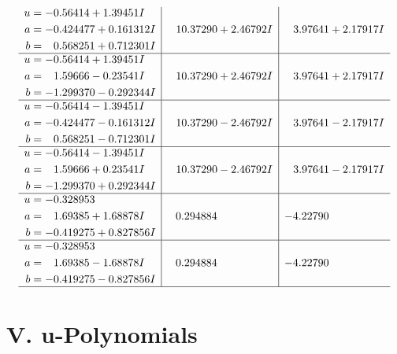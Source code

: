 \documentclass[1p]{elsarticle_modified}
\theoremstyle{definition}
\begin{document}
$$\begin{array}{c|c|c}
\begin{aligned}
u &= -0.56414 + 1.39451 I \\
a &= -0.424477 + 0.161312 I \\
b &= \phantom{-}0.568251 + 0.712301 I\end{aligned}
 & \phantom{-}10.37290 + 2.46792 I & \phantom{-}3.97641 + 2.17917 I \\ \hline\begin{aligned}
u &= -0.56414 + 1.39451 I \\
a &= \phantom{-}1.59666 - 0.23541 I \\
b &= -1.299370 - 0.292344 I\end{aligned}
 & \phantom{-}10.37290 + 2.46792 I & \phantom{-}3.97641 + 2.17917 I \\ \hline\begin{aligned}
u &= -0.56414 - 1.39451 I \\
a &= -0.424477 - 0.161312 I \\
b &= \phantom{-}0.568251 - 0.712301 I\end{aligned}
 & \phantom{-}10.37290 - 2.46792 I & \phantom{-}3.97641 - 2.17917 I \\ \hline\begin{aligned}
u &= -0.56414 - 1.39451 I \\
a &= \phantom{-}1.59666 + 0.23541 I \\
b &= -1.299370 + 0.292344 I\end{aligned}
 & \phantom{-}10.37290 - 2.46792 I & \phantom{-}3.97641 - 2.17917 I \\ \hline\begin{aligned}
u &= -0.328953\phantom{ +0.000000I} \\
a &= \phantom{-}1.69385 + 1.68878 I \\
b &= -0.419275 + 0.827856 I\end{aligned}
 & \phantom{-}0.294884\phantom{ +0.000000I} & -4.22790\phantom{ +0.000000I} \\ \hline\begin{aligned}
u &= -0.328953\phantom{ +0.000000I} \\
a &= \phantom{-}1.69385 - 1.68878 I \\
b &= -0.419275 - 0.827856 I\end{aligned}
 & \phantom{-}0.294884\phantom{ +0.000000I} & -4.22790\phantom{ +0.000000I}\\
 \hline 
 \end{array}$$\newpage
\newpage\renewcommand{\arraystretch}{1}
\centering \section*{ V. u-Polynomials}
\end{document}

